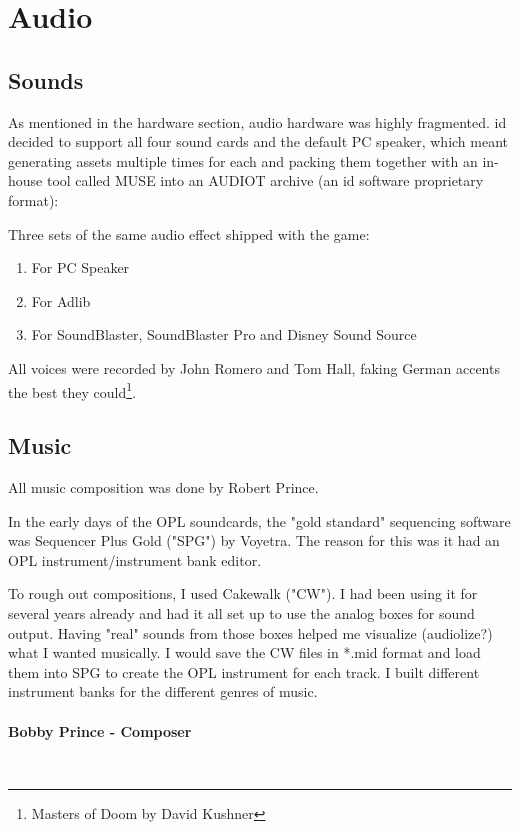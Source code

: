 \documentclass[book.tex]{subfiles}
\begin{document}
\section{Audio}

\subsection{Sounds}
As mentioned in the hardware section, audio hardware was highly fragmented. id decided to support all four sound cards and the default PC speaker, which meant generating assets multiple times for each and packing them together with an in-house tool called MUSE into an AUDIOT archive (an id software proprietary format):\\
\begin{figure}[H]
\centering
 \end{figure}
 \par
 Three sets of the same audio effect shipped with the game:
\begin{enumerate}
\item For PC Speaker
\item For Adlib
\item For SoundBlaster, SoundBlaster Pro and Disney Sound Source
\end{enumerate}

\par
All voices were recorded by John Romero and Tom Hall, faking German accents the best they could\footnote{Masters of Doom by David Kushner}.






\subsection{Music}
All music composition was done by Robert Prince.\\
\par
 \begin{fancyquotes}
In the early days of the OPL soundcards, the "gold standard" sequencing software was Sequencer Plus Gold ("SPG") by Voyetra. The reason for this was it had an OPL instrument/instrument bank editor.\\
\par
To rough out compositions, I used Cakewalk ("CW"). I had been using it for several years already and had it all set up to use the analog boxes for sound output. Having "real" sounds from those boxes helped me visualize (audiolize?) what I wanted musically. I would save the CW files in *.mid format and load them into SPG to create the OPL instrument for each track. I built different instrument banks for the different genres of music.\\
   \\
\textbf{Bobby Prince - Composer}
 \end{fancyquotes}\\
\end{document}
